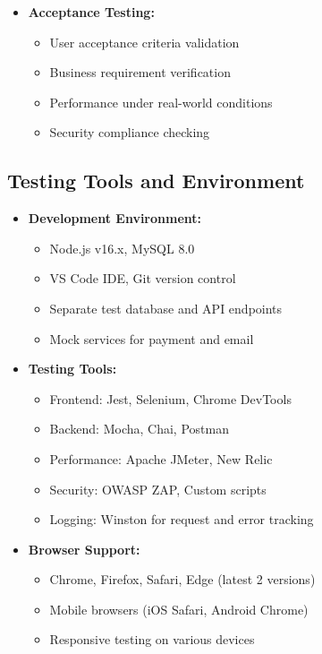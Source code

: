 \begin{itemize}
    \item \textbf{Acceptance Testing:}
    \begin{itemize}
        \item User acceptance criteria validation
        \item Business requirement verification
        \item Performance under real-world conditions
        \item Security compliance checking
    \end{itemize}
\end{itemize}

\subsection{Testing Tools and Environment}
\begin{itemize}
    \item \textbf{Development Environment:}
    \begin{itemize}
        \item Node.js v16.x, MySQL 8.0
        \item VS Code IDE, Git version control
        \item Separate test database and API endpoints
        \item Mock services for payment and email
    \end{itemize}
    
    \item \textbf{Testing Tools:}
    \begin{itemize}
        \item Frontend: Jest, Selenium, Chrome DevTools
        \item Backend: Mocha, Chai, Postman
        \item Performance: Apache JMeter, New Relic
        \item Security: OWASP ZAP, Custom scripts
        \item Logging: Winston for request and error tracking
    \end{itemize}
    
    \item \textbf{Browser Support:}
    \begin{itemize}
        \item Chrome, Firefox, Safari, Edge (latest 2 versions)
        \item Mobile browsers (iOS Safari, Android Chrome)
        \item Responsive testing on various devices
    \end{itemize}
\end{itemize}

